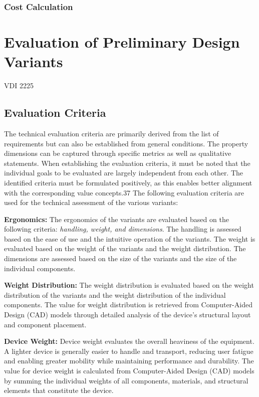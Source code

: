 \subsubsection{Cost Calculation}

\section{Evaluation of Preliminary Design Variants}
VDI 2225

\subsection{Evaluation Criteria}

The technical evaluation criteria are primarily derived from the list of requirements but can also be established from general conditions. The property dimensions can be captured through specific metrics as well as qualitative statements. When establishing the evaluation criteria, it must be noted that the individual goals to be evaluated are largely independent from each other. The identified criteria must be formulated positively, as this enables better alignment with the corresponding value concepts.37 The following evaluation criteria are used for the technical assessment of the various variants:

\textbf{Ergonomics:} The ergonomics of the variants are evaluated based on the following criteria: \textit{handling, weight, and dimensions}. The handling is assessed based on the ease of use and the intuitive operation of the variants. The weight is evaluated based on the weight of the variants and the weight distribution. The dimensions are assessed based on the size of the variants and the size of the individual components.

\textbf{Weight Distribution:} The weight distribution is evaluated based on the weight distribution of the variants and the weight distribution of the individual components. The value for weight distribution is retrieved from Computer-Aided Design (CAD) models through detailed analysis of the device's structural layout and component placement.

\textbf{Device Weight:} Device weight evaluates the overall heaviness of the equipment. A lighter device is generally easier to handle and transport, reducing user fatigue and enabling greater mobility while maintaining performance and durability. The value for device weight is calculated from Computer-Aided Design (CAD) models by summing the individual weights of all components, materials, and structural elements that constitute the device.

